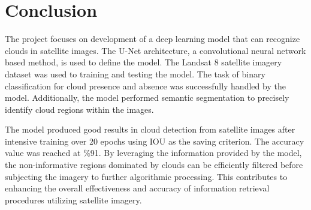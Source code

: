 \chapter{Conclusion}
The project focuses on development of a deep learning model that can recognize clouds in satellite images. The U-Net architecture, a convolutional neural network based method, is used to define the model. The Landsat 8 satellite imagery dataset was used to training and testing the model. The task of binary classification for cloud presence and absence was successfully handled by the model. Additionally, the model performed semantic segmentation to precisely identify cloud regions within the images.

The model produced good results in cloud detection from satellite images after intensive training over 20 epochs using IOU as the saving criterion. The accuracy value was reached at \%91. By leveraging the information provided by the model, the non-informative regions dominated by clouds can be efficiently filtered  before subjecting the imagery to further algorithmic processing. This contributes to enhancing the overall effectiveness and accuracy of information retrieval procedures utilizing satellite imagery.
